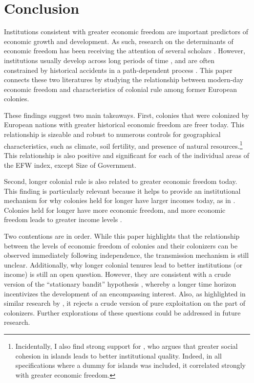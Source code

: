 \documentclass[a4paper,12pt]{article}
\begin{document}
\section{Conclusion}

Institutions consistent with greater economic freedom are important predictors of economic growth and development. As such, research on the determinants of economic freedom has been receiving the attention of several scholars \citep{lawson2020determinants}. However, institutions usually develop across long periods of time \citep{spolaore2013deep}, and are often constrained by historical accidents in a path-dependent process \citep{North1991,page2006path}. This paper connects these two literatures by studying the relationship between modern-day economic freedom and characteristics of colonial rule among former European colonies. 

These findings suggest two main takeaways. First, colonies that were colonized by European nations with greater historical economic freedom are freer today. This relationship is sizeable and robust to numerous controls for geographical characteristics, such as climate, soil fertility, and presence of natural resources.\footnote{Incidentally, I also find strong support for \cite{fors2014island}, who argues that greater social cohesion in islands leads to better institutional quality. Indeed, in all specifications where a dummy for islands was included, it correlated strongly with greater economic freedom.} This relationship is also positive and significant for each of the individual areas of the EFW index, except Size of Government.  

Second, longer colonial rule is also related to greater economic freedom today. This finding is particularly relevant because it helps to provide an institutional mechanism for why colonies held for longer have larger incomes today, as in \cite{grier1999colonial,feyrer2009colonialism}. Colonies held for longer have more economic freedom, and more economic freedom leads to greater income levels \citep{dehaan2006market,lawson2024economic}. 

Two contentions are in order. While this paper highlights that the relationship between the levels of economic freedom of colonies and their colonizers can be observed immediately following independence, the transmission mechanism is still unclear. Additionally, why longer colonial tenures lead to better institutions (or income) is still an open question. However, they are consistent with a crude version of the ``stationary bandit'' hypothesis \cite{olson1993dictatorship}, whereby a longer time horizon incentivizes the development of an encompassing interest. Also, as highlighted in similar research by \cite{grier1999colonial}, it rejects a crude version of pure exploitation on the part of colonizers. Further explorations of these questions could be addressed in future research. 
\end{document}
